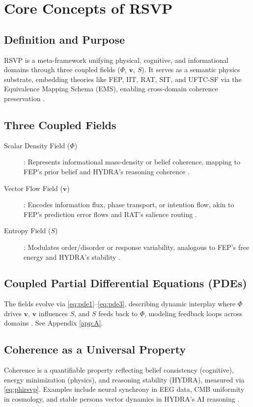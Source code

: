 \documentclass[12pt]{report}
\newcommand{\PhiRSVP}{\Phi}
\newcommand{\vRSVP}{\mathbf{v}}
\newcommand{\SRSVP}{S}
\begin{document}
\chapter{Core Concepts of RSVP}
\section{Definition and Purpose}
RSVP is a meta-framework unifying physical, cognitive, and informational domains through three coupled fields (\(\PhiRSVP\), \(\vRSVP\), \(\SRSVP\)). It serves as a semantic physics substrate, embedding theories like FEP, IIT, RAT, SIT, and UFTC-SF via the Equivalence Mapping Schema (EMS), enabling cross-domain coherence preservation \citep{RSVPMeta2025}.

\section{Three Coupled Fields}
\begin{description}
    \item[Scalar Density Field (\(\PhiRSVP\))]: Represents informational mass-density or belief coherence, mapping to FEP’s prior belief \citep{Friston2010} and HYDRA’s reasoning coherence \citep{HYDRA2025}.
    \item[Vector Flow Field (\(\vRSVP\))]: Encodes information flux, phase transport, or intention flow, akin to FEP’s prediction error flows and RAT’s salience routing \citep{RAT2025}.
    \item[Entropy Field (\(\SRSVP\))]: Modulates order/disorder or response variability, analogous to FEP’s free energy and HYDRA’s stability \citep{Friston2010, HYDRA2025}.
\end{description}

\section{Coupled Partial Differential Equations (PDEs)}
The fields evolve via \eqref{eq:pde1}--\eqref{eq:pde3}, describing dynamic interplay where \(\PhiRSVP\) drives \(\vRSVP\), \(\vRSVP\) influences \(\SRSVP\), and \(\SRSVP\) feeds back to \(\PhiRSVP\), modeling feedback loops across domains \citep{RSVPMeta2025}. See Appendix \ref{app:A}.

\section{Coherence as a Universal Property}
Coherence is a quantifiable property reflecting belief consistency (cognitive), energy minimization (physics), and reasoning stability (HYDRA), measured via \eqref{eq:phirsvp}. Examples include neural synchrony in EEG data, CMB uniformity in cosmology, and stable persona vector dynamics in HYDRA’s AI reasoning \citep{RSVPMeta2025, HYDRA2025}.
\end{document}
